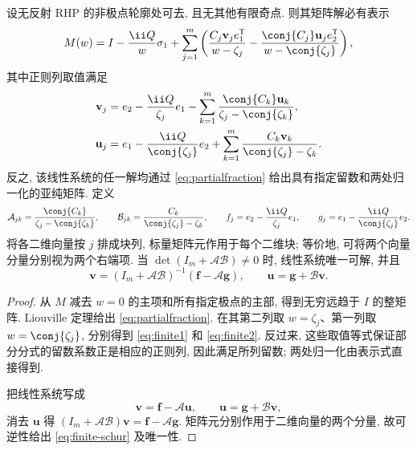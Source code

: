 \begin{proposition}[部分分式表示与可解条件]\label{prop:finite}
设无反射 RHP 的非极点轮廓处可去, 且无其他有限奇点. 则其矩阵解必有表示
\begin{equation}\label{eq:partialfraction}
M(w)=I-\dfrac{\ii Q}{w}\sigma_1
+\sum\limits_{j=1}^{m}
\left(\dfrac{C_j\mathbf v_j e_1^{\mathsf T}}{w-\zeta_j}
-\dfrac{\conj{C_j}\mathbf u_j e_2^{\mathsf T}}{w-\conj{\zeta_j}}\right),
\end{equation}
其中正则列取值满足
\begin{align}
\mathbf v_j&=e_2-\dfrac{\ii Q}{\zeta_j}e_1
-\sum\limits_{k=1}^{m}\dfrac{\conj{C_k}\mathbf u_k}{\zeta_j-\conj{\zeta_k}},
\label{eq:finite1}\\
\mathbf u_j&=e_1-\dfrac{\ii Q}{\conj{\zeta_j}}e_2
+\sum\limits_{k=1}^{m}\dfrac{C_k\mathbf v_k}{\conj{\zeta_j}-\zeta_k}.
\label{eq:finite2}
\end{align}
反之, 该线性系统的任一解均通过 \eqref{eq:partialfraction} 给出具有指定留数和两处归一化的亚纯矩阵. 定义
\[
\mathcal A_{jk}=\dfrac{\conj{C_k}}{\zeta_j-\conj{\zeta_k}},\qquad
\mathcal B_{jk}=\dfrac{C_k}{\conj{\zeta_j}-\zeta_k},\qquad
f_j=e_2-\dfrac{\ii Q}{\zeta_j}e_1,\qquad
g_j=e_1-\dfrac{\ii Q}{\conj{\zeta_j}}e_2.
\]
将各二维向量按 $j$ 排成块列, 标量矩阵元作用于每个二维块; 等价地, 可将两个向量分量分别视为两个右端项. 当 $\det(I_m+\mathcal A\mathcal B)\ne0$ 时, 线性系统唯一可解, 并且
\begin{equation}\label{eq:finite-schur}
\boldsymbol v=(I_m+\mathcal A\mathcal B)^{-1}
(\boldsymbol f-\mathcal A\boldsymbol g),\qquad
\boldsymbol u=\boldsymbol g+\mathcal B\boldsymbol v.
\end{equation}
\end{proposition}
\begin{proof}
从 $M$ 减去 $w=0$ 的主项和所有指定极点的主部, 得到无穷远趋于 $I$ 的整矩阵. Liouville 定理给出 \eqref{eq:partialfraction}. 在其第二列取 $w=\zeta_j$、第一列取 $w=\conj{\zeta_j}$, 分别得到 \eqref{eq:finite1} 和 \eqref{eq:finite2}. 反过来, 这些取值等式保证部分分式的留数系数正是相应的正则列, 因此满足所列留数; 两处归一化由表示式直接得到.

把线性系统写成
\[
\boldsymbol v=\boldsymbol f-\mathcal A\boldsymbol u,\qquad
\boldsymbol u=\boldsymbol g+\mathcal B\boldsymbol v,
\]
消去 $\boldsymbol u$ 得
$(I_m+\mathcal A\mathcal B)\boldsymbol v=\boldsymbol f-\mathcal A\boldsymbol g$.
矩阵元分别作用于二维向量的两个分量, 故可逆性给出 \eqref{eq:finite-schur} 及唯一性.
\end{proof}

